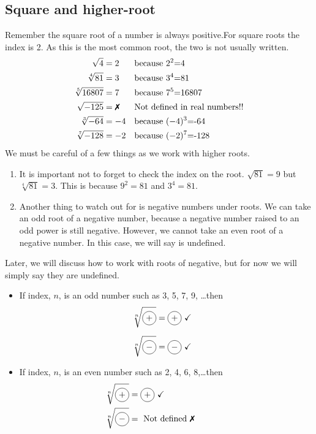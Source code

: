 \subsection{Square and higher-root}
Remember the square root of a number is always positive.For square roots the index 
is 2. As this is the most common root, the two is not usually written.
\begin{align*}
			\sqrt{4} &=2		&&\text{because $2^2$=4}\\
			\sqrt[4]{81} &=3 	&&\text{because $3^4$=81}\\
			\sqrt[5]{16807} &=7		&&\text{because $7^5$=16807}\\
			\sqrt{-125} &=\text{\xmark} &&\text{Not defined in real numbers!!}\\
			\sqrt[3]{-64} &=-4 &&\text{because $(-4)^3$=-64}\\
			\sqrt[7]{-128} &=-2 &&\text{because $(-2)^7$=-128}
\end{align*}
We must be careful of a few things as we work with higher roots. 
\begin{enumerate}
\item It is important not to forget to check the index on the root. $\sqrt{81}=9$ 	
		but $\sqrt[4]{81}=3$. This is because $9^2 = 81$ and $3^4 = 81$. 
\item Another thing to watch out for is negative numbers under roots. We can take an 
		odd root of a negative number, because a negative number
		raised to an odd power is still negative. However, we cannot take an even
		root of a negative number. In this case, we will say is undefined. 
\end{enumerate}		
\begin{nt}
Later, we will discuss how to work with roots of negative, but for now 
we will simply say they are undefined.
\end{nt}
\begin{tcolorbox}[title=Radical in real realm, fonttitle=\bfseries,
                 colframe=blue!70!red,
                 colback =white]
	\begin{itemize}
		\item If index, $n$, is an odd number such as 3, 5, 7, 9, \ldots then
				\begin{align*}
				\sqrt[n]{\circled{+}} &= \circled{+} \,\,\checkmark &&\\[.2cm]
				\sqrt[n]{\circled{$-$}} &= \circled{$-$} \,\,\checkmark &&
				\end{align*}
		\item If index, $n$, is an even number such as 2, 4, 6, 8,\ldots then
				\begin{align*}
					\sqrt[n]{\circled{+}} &= \circled{+} \,\,\checkmark \hspace{2.6cm}\\
					\sqrt[n]{\circled{$-$}} &=\,\, \text{Not defined} \,\,\text{\xmark}
				\end{align*}
	\end{itemize}
\end{tcolorbox}
